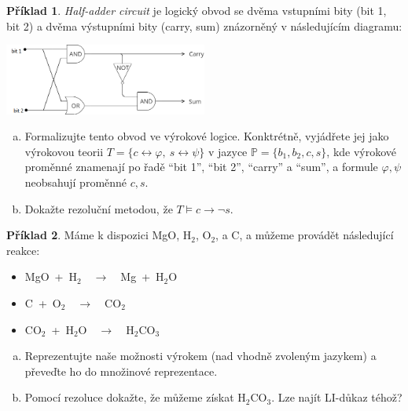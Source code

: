 \documentclass[a4paper]{article}
\theoremstyle{plain}
\theoremstyle{definition}
\newtheorem{problem}{Příklad}
\begin{document}
\medskip\begin{problem}
\emph{Half-adder circuit} je logický obvod se dvěma vstupními bity (bit 1, bit 2) a dvěma výstupními bity (carry, sum) znázorněný v následujícím diagramu:
\begin{center}
    \includegraphics[width=0.5\textwidth]{files/half-adder.png}
\end{center}
\begin{enumerate}[(a)]
        \item Formalizujte tento obvod ve výrokové logice. Konktrétně, vyjádřete jej jako výrokovou teorii $T=\{c\leftrightarrow \varphi,\ s\leftrightarrow \psi\}$ v jazyce $\mathbb P=\{b_1,b_2,c,s\}$, kde výrokové proměnné znamenají po řadě ``bit 1'', ``bit 2'', ``carry'' a ``sum'', a formule $\varphi,\psi$ neobsahují proměnné $c,s$.
        \item Dokažte rezoluční metodou, že $T\models c\to\neg s$.
\end{enumerate}
\end{problem}


\medskip\begin{problem} Máme k dispozici MgO, H$_2$, O$_2$, a C, a můžeme provádět následující reakce:
    \begin{itemize}
        \item MgO\ +\ H$_2$\ \ $\to$\ \ Mg\ +\ H$_2$O
        \item C\ +\ O$_2$\ \ $\to$\ \ CO$_2$
        \item CO$_2$\ +\ H$_2$O\ \ $\to$\ \ H$_2$CO$_3$
    \end{itemize}
    \begin{enumerate}[(a)]
        \item Reprezentujte naše možnosti výrokem (nad vhodně zvoleným jazykem) a převeďte ho do množinové reprezentace.
        \item Pomocí rezoluce dokažte, že můžeme získat H$_2$CO$_3$. Lze najít LI-důkaz téhož?
    \end{enumerate}
\end{problem}
\end{document}
